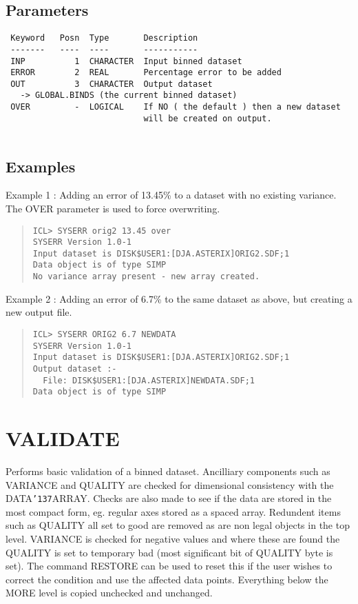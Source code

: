 \documentclass{book}
\renewcommand{\_}{{\tt\char'137}}     %
\begin{document}
\subsection{Parameters}
\begin{verbatim}
 Keyword   Posn  Type       Description
 -------   ----  ----       -----------
 INP          1  CHARACTER  Input binned dataset
 ERROR        2  REAL       Percentage error to be added
 OUT          3  CHARACTER  Output dataset
   -> GLOBAL.BINDS (the current binned dataset)
 OVER         -  LOGICAL    If NO ( the default ) then a new dataset
                            will be created on output.
 
\end{verbatim}\subsection{Examples}
Example 1 : Adding an error of 13.45\% to a dataset with no
existing variance. The OVER parameter is used to
force overwriting.
 
\begin{quote}\begin{verbatim}
ICL> SYSERR orig2 13.45 over
SYSERR Version 1.0-1
Input dataset is DISK$USER1:[DJA.ASTERIX]ORIG2.SDF;1
Data object is of type SIMP
No variance array present - new array created.
\end{verbatim}\end{quote}
Example 2 : Adding an error of 6.7\% to the same dataset as above,
but creating a new output file.
\begin{quote}\begin{verbatim}
ICL> SYSERR ORIG2 6.7 NEWDATA
SYSERR Version 1.0-1
Input dataset is DISK$USER1:[DJA.ASTERIX]ORIG2.SDF;1
Output dataset :-
  File: DISK$USER1:[DJA.ASTERIX]NEWDATA.SDF;1
Data object is of type SIMP
\end{verbatim}\end{quote}
\section{VALIDATE}
Performs basic validation of a binned dataset. Ancilliary
components such as VARIANCE and QUALITY are checked for
dimensional consistency with the DATA\_ARRAY. Checks are
also made to see if the data are stored in the most compact
form, eg. regular axes stored as a spaced array. Redundent
items such as QUALITY all set to good are removed as are non
legal objects in the top level. VARIANCE is checked for
negative values and where these are found the QUALITY is
set to temporary bad (most significant bit of QUALITY byte
is set). The command RESTORE can be used to reset this if
the user wishes to correct the condition and use the affected
data points. Everything below the MORE level is copied
unchecked and unchanged.
 
\end{document}

